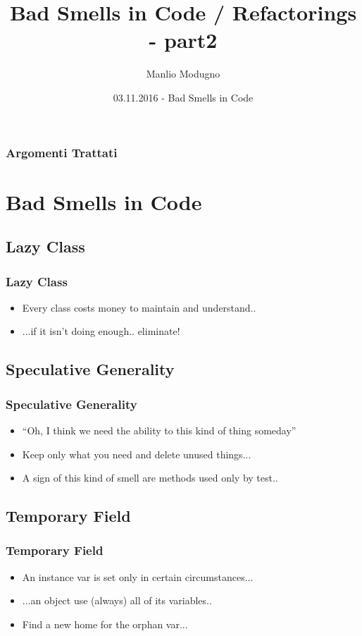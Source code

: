 \documentclass{beamer}
\title{Bad Smells in Code / Refactorings - part2}
\author{Manlio Modugno}
\institute[GMTechnologies]
\date[03.11.2016] 
{03.11.2016 - Bad Smells in Code}
\begin{document}
\begin{frame}
  \titlepage
\end{frame}

\begin{frame}
  \frametitle{Argomenti Trattati}
  \tableofcontents
\end{frame}

\section{Bad Smells in Code}
\subsection{Lazy Class}
\begin{frame}
  \frametitle{Lazy Class}
  \begin{itemize}
	\item<+-> Every class costs money to maintain and understand..
	\item<+-> ...if it isn't doing enough.. eliminate! 
  \end{itemize}
\end{frame}

\subsection{Speculative Generality}
\begin{frame}
  \frametitle{Speculative Generality}
  \begin{itemize}
	\item<+-> ``Oh, I think we need the ability to this kind of thing someday''
	\item<+-> Keep only what you need and delete unused things...
	\item<+-> A sign of this  kind of smell are methods used only by test..
  \end{itemize}
\end{frame}

\subsection{Temporary Field}
\begin{frame}
  \frametitle{Temporary Field}
  \begin{itemize}
	\item<+-> An instance var is set only in certain circumstances...
	\item<+-> ...an object use (always) all of its variables.. 
	\item<+-> Find a new home for the orphan var...
  \end{itemize}
\end{frame}
\end{document}
